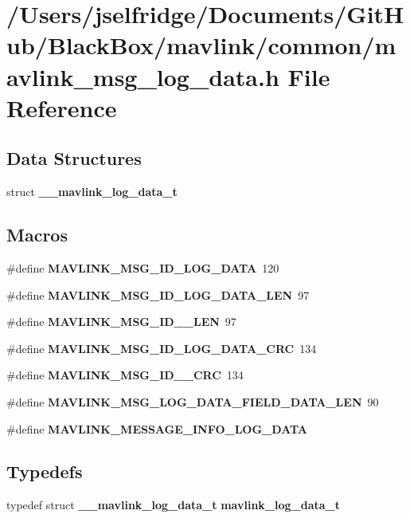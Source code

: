 \section{/\+Users/jselfridge/\+Documents/\+Git\+Hub/\+Black\+Box/mavlink/common/mavlink\+\_\+msg\+\_\+log\+\_\+data.h File Reference}
\label{mavlink__msg__log__data_8h}
\subsection*{Data Structures}
\begin{DoxyCompactItemize}
\item 
struct \textbf{ \+\_\+\+\_\+mavlink\+\_\+log\+\_\+data\+\_\+t}
\end{DoxyCompactItemize}
\subsection*{Macros}
\begin{DoxyCompactItemize}
\item 
\#define \textbf{ M\+A\+V\+L\+I\+N\+K\+\_\+\+M\+S\+G\+\_\+\+I\+D\+\_\+\+L\+O\+G\+\_\+\+D\+A\+TA}~120
\item 
\#define \textbf{ M\+A\+V\+L\+I\+N\+K\+\_\+\+M\+S\+G\+\_\+\+I\+D\+\_\+\+L\+O\+G\+\_\+\+D\+A\+T\+A\+\_\+\+L\+EN}~97
\item 
\#define \textbf{ M\+A\+V\+L\+I\+N\+K\+\_\+\+M\+S\+G\+\_\+\+I\+D\+\_\+\_\+\+L\+EN}~97
\item 
\#define \textbf{ M\+A\+V\+L\+I\+N\+K\+\_\+\+M\+S\+G\+\_\+\+I\+D\+\_\+\+L\+O\+G\+\_\+\+D\+A\+T\+A\+\_\+\+C\+RC}~134
\item 
\#define \textbf{ M\+A\+V\+L\+I\+N\+K\+\_\+\+M\+S\+G\+\_\+\+I\+D\+\_\+\_\+\+C\+RC}~134
\item 
\#define \textbf{ M\+A\+V\+L\+I\+N\+K\+\_\+\+M\+S\+G\+\_\+\+L\+O\+G\+\_\+\+D\+A\+T\+A\+\_\+\+F\+I\+E\+L\+D\+\_\+\+D\+A\+T\+A\+\_\+\+L\+EN}~90
\item 
\#define \textbf{ M\+A\+V\+L\+I\+N\+K\+\_\+\+M\+E\+S\+S\+A\+G\+E\+\_\+\+I\+N\+F\+O\+\_\+\+L\+O\+G\+\_\+\+D\+A\+TA}
\end{DoxyCompactItemize}
\subsection*{Typedefs}
\begin{DoxyCompactItemize}
\item 
typedef struct \textbf{ \+\_\+\+\_\+mavlink\+\_\+log\+\_\+data\+\_\+t} \textbf{ mavlink\+\_\+log\+\_\+data\+\_\+t}
\end{DoxyCompactItemize}


